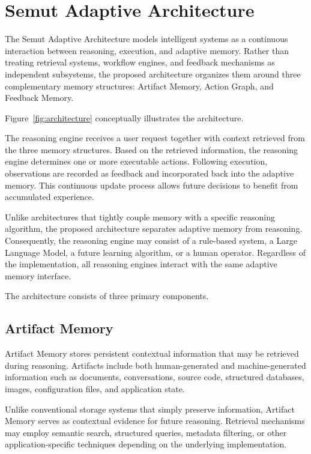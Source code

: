 \section{Semut Adaptive Architecture}
\label{sec:architecture}

The Semut Adaptive Architecture models intelligent systems as a continuous interaction between reasoning, execution, and adaptive memory. Rather than treating retrieval systems, workflow engines, and feedback mechanisms as independent subsystems, the proposed architecture organizes them around three complementary memory structures: Artifact Memory, Action Graph, and Feedback Memory.

Figure~\ref{fig:architecture} conceptually illustrates the architecture.

The reasoning engine receives a user request together with context retrieved from the three memory structures. Based on the retrieved information, the reasoning engine determines one or more executable actions. Following execution, observations are recorded as feedback and incorporated back into the adaptive memory. This continuous update process allows future decisions to benefit from accumulated experience.

Unlike architectures that tightly couple memory with a specific reasoning algorithm, the proposed architecture separates adaptive memory from reasoning. Consequently, the reasoning engine may consist of a rule-based system, a Large Language Model, a future learning algorithm, or a human operator. Regardless of the implementation, all reasoning engines interact with the same adaptive memory interface.

The architecture consists of three primary components.

\subsection{Artifact Memory}

Artifact Memory stores persistent contextual information that may be retrieved during reasoning. Artifacts include both human-generated and machine-generated information such as documents, conversations, source code, structured databases, images, configuration files, and application state.

Unlike conventional storage systems that simply preserve information, Artifact Memory serves as contextual evidence for future reasoning. Retrieval mechanisms may employ semantic search, structured queries, metadata filtering, or other application-specific techniques depending on the underlying implementation.

